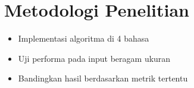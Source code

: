 


\section{Metodologi Penelitian}
\label{sec:metodologiPenelitian}

\begin{itemize}
	\item Implementasi algoritma di 4 bahasa
	\item Uji performa pada input beragam ukuran
	\item Bandingkan hasil berdasarkan metrik tertentu
\end{itemize}



